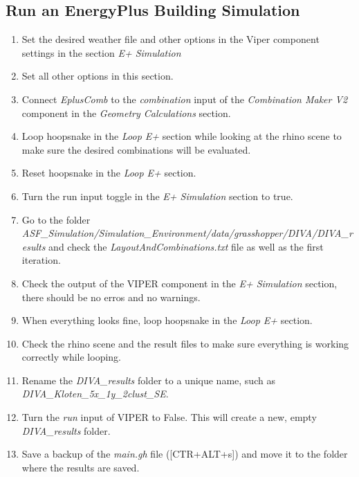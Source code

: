 	\subsection{Run an EnergyPlus Building Simulation}
	\begin{enumerate}

	\item Set the desired weather file and other options in the Viper component settings in the section \emph{E+ Simulation}

	\item Set all other options in this section. 

	\item Connect \emph{EplusComb} to the \emph{combination} input of the \emph{Combination Maker V2} component in the \emph{Geometry Calculations} section.  

	\item Loop hoopsnake in the \emph{Loop E+} section while looking at the rhino scene to make sure the desired combinations will be evaluated. 

	\item Reset hoopsnake in the \emph{Loop E+} section. 

	\item Turn the run input toggle in the \emph{E+ Simulation} section to true. 

	\item Go to the folder \emph{ASF\_Simulation/Simulation\_Environment/data/\linebreak grasshopper/DIVA/DIVA\_results} and check the \emph{LayoutAndCombinations.txt} file as well as the first iteration. 

	\item Check the output of the VIPER component in the \emph{E+ Simulation} section, there should be no erros and no warnings. 

	\item When everything looks fine, loop hoopsnake in the \emph{Loop E+} section. 

	\item Check the rhino scene and the result files to make sure everything is working correctly while looping. 

	\item Rename the \emph{DIVA\_results} folder to a unique name, such as \linebreak\emph{DIVA\_Kloten\_5x\_1y\_2clust\_SE}. 

	\item Turn the \emph{run} input of VIPER to False. This will create a new, empty \emph{DIVA\_results} folder. 
\
	\item Save a backup of the \emph{main.gh} file ([CTR+ALT+s]) and move it to the folder where the results are saved. 
	\end{enumerate}



